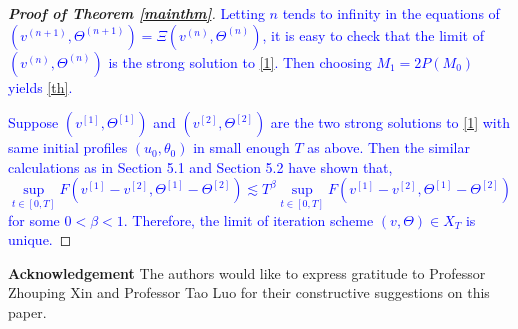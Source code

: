 \documentclass[12pt,a4paper]{amsart}
\numberwithin{equation}{section}
\theoremstyle{plain}
\theoremstyle{definition}
\begin{document}
\vspace{0.3cm}

\begin{proof}[\textbf{Proof of Theorem \ref{mainthm}}]
\textcolor{blue}{		Letting $n$ tends to infinity in the equations of $(v^{(n+1)},\Theta^{(n+1)})=\Xi(v^{(n)},\Theta^{(n)})$, it is easy to check that the limit of $(v^{(n)},\Theta^{(n)})$ is the strong solution to \eqref{1}. Then choosing $M_1=2P(M_0)$ yields \eqref{th}.}
		
\textcolor{blue}{		Suppose $(v^{[1]},\Theta^{[1]})$ and $(v^{[2]},\Theta^{[2]})$ are the two strong solutions to \eqref{1} with same initial profiles $(u_0,\theta_0)$ in small enough $T$ as above. Then the similar calculations as in Section 5.1 and Section 5.2 have shown that, 
	\begin{equation}
	\sup\limits_{t\in[0,T]}F(v^{[1]}-v^{[2]},\Theta^{[1]}-\Theta^{[2]})\lesssim  T^{\beta}\sup\limits_{t\in[0,T]}F(v^{[1]}-v^{[2]},\Theta^{[1]}-\Theta^{[2]})
	\end{equation}
	for some $0<\beta<1$.
	Therefore,  the limit of iteration scheme $(v,\Theta)\in X_T$ is  unique.} %
\end{proof}
\fi


\vspace{0.8cm}
\textbf{Acknowledgement} The authors would like to express gratitude to Professor Zhouping Xin and Professor Tao Luo for their constructive suggestions on this paper.
\clearpage



\vspace{0.7cm}


\end{document}

